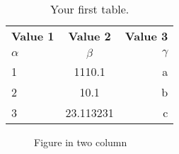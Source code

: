 \documentclass[a4paper]{article}
\begin{document}
\begin{multicols}{2}
\lipsum[1-3]
\begin{table}[H]
  \begin{center}
    \caption{Your first table.}
    \label{tab:table1}
    \begin{tabular}{l|c|r} %
      \textbf{Value 1} & \textbf{Value 2} & \textbf{Value 3}\\
      $\alpha$ & $\beta$ & $\gamma$ \\
      \hline
      1 & 1110.1 & a\\
      2 & 10.1 & b\\
      3 & 23.113231 & c\\
    \end{tabular}
  \end{center}
\end{table}
\lipsum[3-4]
\begin{figure}[H]
  \centering
  \caption{Figure in two column}
\end{figure}
\lipsum[5-6]
\end{multicols}
\end{document}
